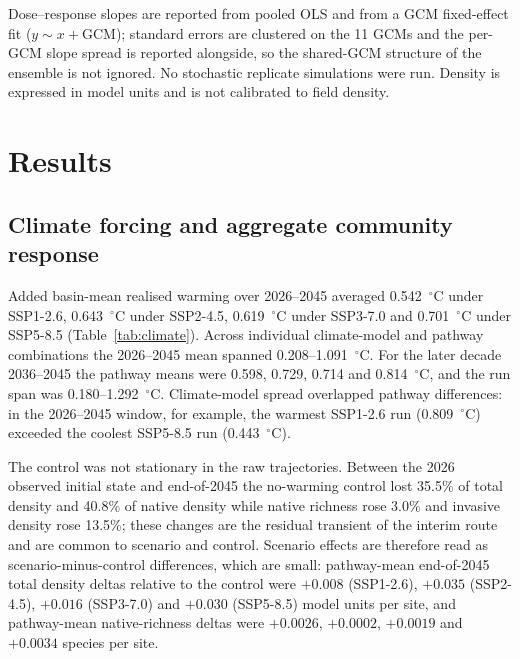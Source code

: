 \documentclass[11pt,a4paper]{article}
\begin{document}
Dose--response slopes are reported from pooled OLS and from a GCM fixed-effect fit ($y\sim x+\text{GCM}$); standard errors are clustered on the 11 GCMs and the per-GCM slope spread is reported alongside, so the shared-GCM structure of the ensemble is not ignored. No stochastic replicate simulations were run. Density is expressed in model units and is not calibrated to field density.

\section{Results}

\subsection{Climate forcing and aggregate community response}

Added basin-mean realised warming over 2026--2045 averaged 0.542~$^\circ$C under SSP1-2.6, 0.643~$^\circ$C under SSP2-4.5, 0.619~$^\circ$C under SSP3-7.0 and 0.701~$^\circ$C under SSP5-8.5 (Table~\ref{tab:climate}). Across individual climate-model and pathway combinations the 2026--2045 mean spanned 0.208--1.091~$^\circ$C. For the later decade 2036--2045 the pathway means were 0.598, 0.729, 0.714 and 0.814~$^\circ$C, and the run span was 0.180--1.292~$^\circ$C. Climate-model spread overlapped pathway differences: in the 2026--2045 window, for example, the warmest SSP1-2.6 run (0.809~$^\circ$C) exceeded the coolest SSP5-8.5 run (0.443~$^\circ$C).

The control was not stationary in the raw trajectories. Between the 2026 observed initial state and end-of-2045 the no-warming control lost 35.5\% of total density and 40.8\% of native density while native richness rose 3.0\% and invasive density rose 13.5\%; these changes are the residual transient of the interim route and are common to scenario and control. Scenario effects are therefore read as scenario-minus-control differences, which are small: pathway-mean end-of-2045 total density deltas relative to the control were $+0.008$ (SSP1-2.6), $+0.035$ (SSP2-4.5), $+0.016$ (SSP3-7.0) and $+0.030$ (SSP5-8.5) model units per site, and pathway-mean native-richness deltas were $+0.0026$, $+0.0002$, $+0.0019$ and $+0.0034$ species per site.
\end{document}
